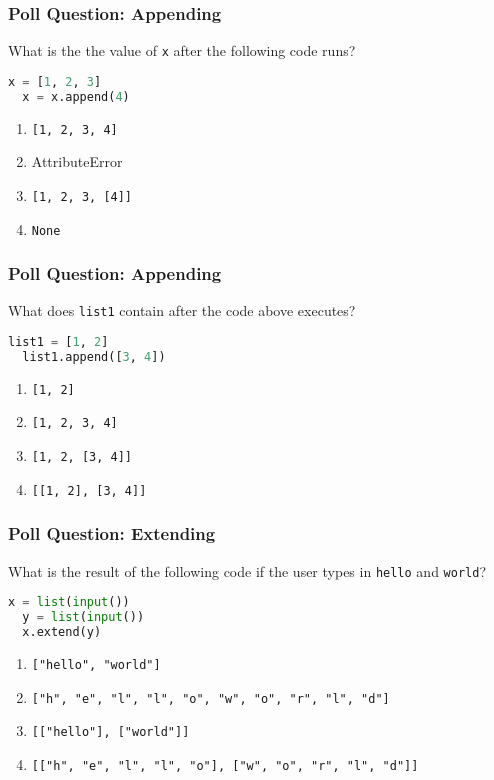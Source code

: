 \documentclass{beamer}
\begin{document}
%
%
\begin{frame}[fragile]
  \frametitle{Poll Question: Appending}
  What is the the value of \lstinline|x| after the following code runs?
  \begin{lstlisting}[language=Python, autogobble]
  x = [1, 2, 3]
  x = x.append(4)
  \end{lstlisting}
  \vfill
  \begin{enumerate}[A] 
    \item \lstinline|[1, 2, 3, 4]|
    \item AttributeError
    \item \lstinline|[1, 2, 3, [4]]|
    \item \lstinline|None|
  \end{enumerate}
\end{frame}


%
%
\begin{frame}[fragile]
  \frametitle{Poll Question: Appending}
  What does \lstinline|list1| contain after the code above executes?
  \begin{lstlisting}[language=Python, autogobble]
  list1 = [1, 2]
  list1.append([3, 4])
  \end{lstlisting}
  \vfill
  \begin{enumerate}[A] 
    \item \lstinline|[1, 2]|
    \item \lstinline|[1, 2, 3, 4]|
    \item \lstinline|[1, 2, [3, 4]]| %
    \item \lstinline|[[1, 2], [3, 4]]|
  \end{enumerate}
\end{frame}

%
%
\begin{frame}[fragile]
  \frametitle{Poll Question: Extending}
  What is the result of the following code if the user types in
  \lstinline|hello| and \lstinline|world|?
  \begin{lstlisting}[language=Python, autogobble]
  x = list(input())
  y = list(input())
  x.extend(y)
  \end{lstlisting}
  \vfill
  \begin{enumerate}[A] 
    \item \lstinline|["hello", "world"]|
    \item \lstinline|["h", "e", "l", "l", "o", "w", "o", "r", "l", "d"]|
    \item \lstinline|[["hello"], ["world"]]|
    \item \lstinline|[["h", "e", "l", "l", "o"], ["w", "o", "r", "l", "d"]]|
  \end{enumerate}
\end{frame}
\end{document}

